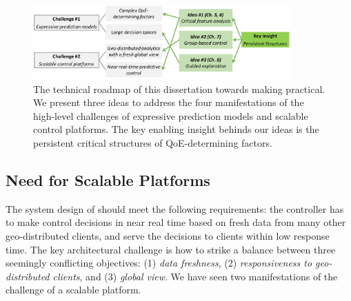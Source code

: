 \begin{figure}[t!]
\centering
\includegraphics[width=0.88\textwidth]{figures/overview-roadmap.pdf}
\caption{
The technical roadmap of this dissertation towards making \ddn practical. We present three 
ideas to address the four manifestations of the high-level challenges of expressive prediction
models and scalable control platforms. The key enabling insight behinds our ideas is the 
persistent critical structures of QoE-determining factors. 
}
\label{fig:overview-roadmap}
\end{figure}



\subsection{Need for Scalable Platforms}
\label{subsec:overview:challenge2}

The system design of \ddn should meet the following requirements:
the \ddn controller has to make control decisions 
in near real time based on fresh data from many
other geo-distributed clients, and serve the decisions 
to clients within low response time.
The key architectural challenge is how to strike a balance between 
three seemingly conflicting objectives: 
(1) {\em data freshness}, 
(2) {\em responsiveness to geo-distributed clients},
and (3) {\em global view}.
We have seen two manifestations of the challenge of a scalable platform.

